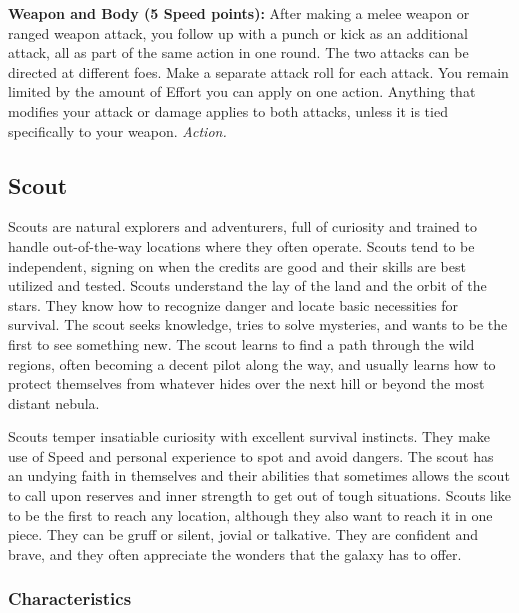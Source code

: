 \documentclass[a4paper,10pt,final,twocolumn,oneside]{book}
\newcommand{\itemAbility}[2]{\textcolor{25gray}{\textbullet\textbf{ #1:}}{ #2}\par}
\newcommand{\action}{\textit{ Action.}}
\begin{document}
\itemAbility{Weapon and Body (5 Speed points)}{After making a melee weapon or ranged weapon attack, you follow up with a punch or kick as an additional attack, all as part of the same action in one round. The two attacks can be directed at different foes. Make a separate attack roll for each attack. You remain limited by the amount of Effort you can apply on one action. Anything that modifies your attack or damage applies to both attacks, unless it is tied specifically to your weapon.\action}


%
%
%
%
%
%
%
%
%
%
%
%
%
%
%
%
%
%
%


\subsection*{Scout} %
\label{sub:scout}

Scouts are natural explorers and adventurers, full of curiosity and trained to handle out-of-the-way locations where they often operate. Scouts tend to be independent, signing on when the credits are good and their skills are best utilized and tested. Scouts understand the lay of the land and the orbit of the stars. They know how to recognize danger and locate basic necessities for survival. The scout seeks knowledge, tries to solve mysteries, and wants to be the first to see something new. The scout learns to find a path through the wild regions, often becoming a decent pilot along the way, and usually learns how to protect themselves from whatever hides over the next hill or beyond the most distant nebula.

Scouts temper insatiable curiosity with excellent survival instincts. They make use of Speed and personal experience to spot and avoid dangers. The scout has an undying faith in themselves and their abilities that sometimes allows the scout to call upon reserves and inner strength to get out of tough situations. Scouts like to be the first to reach any location, although they also want to reach it in one piece. They can be gruff or silent, jovial or talkative. They are confident and brave, and they often appreciate the wonders that the galaxy has to offer.

\subsubsection*{Characteristics}
\label{subsub:scoutCharacteristics}
\end{document}
